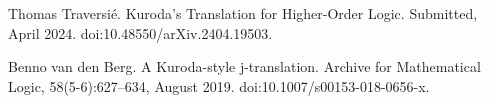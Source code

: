\documentclass[10pt,a4paper]{article}
\begin{document}
\par\noindent  [21]  Thomas Traversié.  Kuroda’s Translation for Higher-Order Logic.  Submitted, April 2024.  doi:10.48550/arXiv.2404.19503.  
 
\par\noindent  [22]  Benno van den Berg.  A Kuroda-style j-translation.  Archive for Mathematical Logic, 58(5-6):627–634, August 2019.  doi:10.1007/s00153-018-0656-x.  
  
\end{document}

